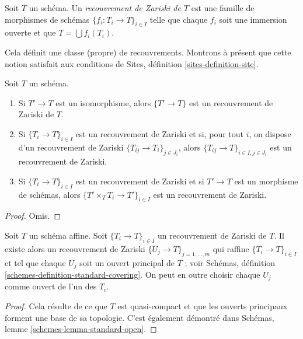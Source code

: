 \begin{definition}
\label{definition-zariski-covering}
Soit $T$ un schéma. Un {\it recouvrement de Zariski de $T$} est une famille
de morphismes de schémas $\{f_i : T_i \to T\}_{i \in I}$
telle que chaque $f_i$ soit une immersion ouverte et que
$T = \bigcup f_i(T_i)$.
\end{definition}

\noindent
Cela définit une classe (propre) de recouvrements.
Montrons à présent que cette notion satisfait aux conditions de
Sites, définition \ref{sites-definition-site}.

\begin{lemma}
\label{lemma-zariski}
Soit $T$ un schéma.
\begin{enumerate}
\item Si $T' \to T$ est un isomorphisme, alors $\{T' \to T\}$
est un recouvrement de Zariski de $T$.
\item Si $\{T_i \to T\}_{i\in I}$ est un recouvrement de Zariski et si, pour tout
$i$, on dispose d'un recouvrement de Zariski $\{T_{ij} \to T_i\}_{j\in J_i}$, alors
$\{T_{ij} \to T\}_{i \in I, j\in J_i}$ est un recouvrement de Zariski.
\item Si $\{T_i \to T\}_{i\in I}$ est un recouvrement de Zariski
et si $T' \to T$ est un morphisme de schémas, alors
$\{T' \times_T T_i \to T'\}_{i\in I}$ est un recouvrement de Zariski.
\end{enumerate}
\end{lemma}

\begin{proof}
Omis.
\end{proof}

\begin{lemma}
\label{lemma-zariski-affine}
Soit $T$ un schéma affine. Soit $\{T_i \to T\}_{i \in I}$ un
recouvrement de Zariski de $T$. Il existe alors un recouvrement de Zariski
$\{U_j \to T\}_{j = 1, \ldots, m}$ qui raffine
$\{T_i \to T\}_{i \in I}$ et tel que chaque $U_j$ soit un ouvert
principal de $T$ ; voir
Schémas, définition \ref{schemes-definition-standard-covering}.
On peut en outre choisir chaque $U_j$ comme ouvert de l'un des $T_i$.
\end{lemma}

\begin{proof}
Cela résulte de ce que $T$ est quasi-compact et que les ouverts principaux forment une base
de sa topologie. C'est également démontré dans
Schémas, lemme \ref{schemes-lemma-standard-open}.
\end{proof}


